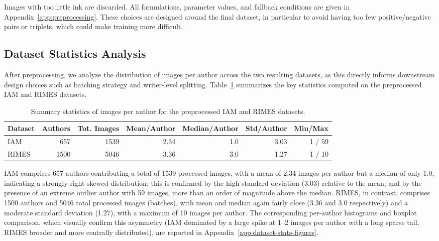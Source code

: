 Images with too little ink are discarded. All formulations, parameter values, and
fallback conditions are given in Appendix~\ref{app:preprocessing}. These choices are designed
around the final dataset, in particular to avoid having too few positive/negative pairs or
triplets, which could make training more difficult.

\subsection{Dataset Statistics Analysis}
\label{subsec:dataset-stats}

After preprocessing, we analyze the distribution of images per author across the two resulting datasets, as this directly informs downstream design choices such as batching strategy and writer-level splitting. Table~\ref{tab:dataset-stats} summarizes the key statistics computed on the preprocessed IAM and RIMES datasets.

\begin{table}[h]
\centering
\caption{Summary statistics of images per author for the preprocessed IAM and RIMES datasets.}
\label{tab:dataset-stats}
\begin{tabular}{lrrrrrr}
\toprule
\textbf{Dataset} & \textbf{Authors} & \textbf{Tot. Images} & \textbf{Mean/Author} & \textbf{Median/Author} & \textbf{Std/Author} & \textbf{Min/Max} \\
\midrule
IAM   & 657  & 1539 & 2.34 & 1.0 & 3.03 & 1 / 59 \\
RIMES & 1500 & 5046 & 3.36 & 3.0 & 1.27 & 1 / 10 \\
\bottomrule
\end{tabular}
\end{table}

IAM comprises 657 authors contributing a total of 1539 processed images, with a mean of 2.34 images per author but a median of only 1.0, indicating a strongly right-skewed distribution; this is confirmed by the high standard deviation (3.03) relative to the mean, and by the presence of an extreme outlier author with 59 images, more than an order of magnitude above the median. RIMES, in contrast, comprises 1500 authors and 5046 total processed images (batches), with mean and median again fairly close (3.36 and 3.0 respectively) and a moderate standard deviation (1.27), with a maximum of 10 images per author. The corresponding per-author histograms and boxplot comparison, which visually confirm this asymmetry (IAM dominated by a large spike at 1--2 images per author with a long sparse tail, RIMES broader and more centrally distributed), are reported in Appendix~\ref{app:dataset-stats-figures}.

